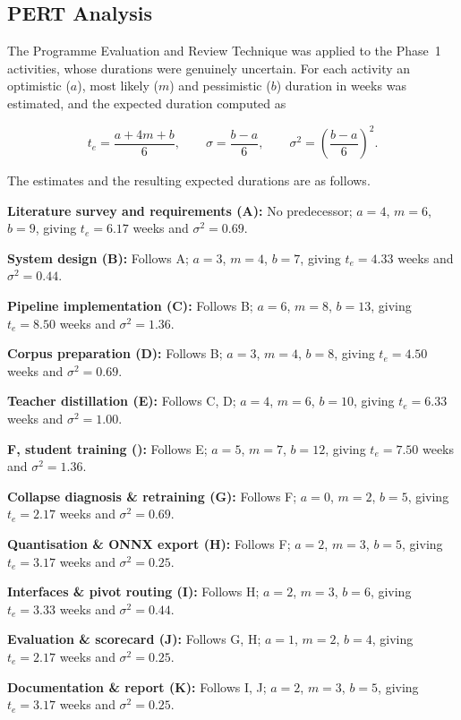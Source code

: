 \subsection{PERT Analysis}
\label{subsec:pert}

The Programme Evaluation and Review Technique was applied to the Phase~1
activities, whose durations were genuinely uncertain. For each activity an
optimistic ($a$), most likely ($m$) and pessimistic ($b$) duration in weeks was
estimated, and the expected duration computed as

\begin{equation}
t_e = \frac{a + 4m + b}{6}, \qquad
\sigma = \frac{b - a}{6}, \qquad
\sigma^2 = \left(\frac{b-a}{6}\right)^{\!2}.
\end{equation}

The estimates and the resulting expected durations are as follows.

\begin{bullets}
\item \textbf{Literature survey and requirements (A):} No predecessor; $a=4$, $m=6$, $b=9$, giving $t_e=6.17$ weeks and $\sigma^2=0.69$.
\item \textbf{System design (B):} Follows A; $a=3$, $m=4$, $b=7$, giving $t_e=4.33$ weeks and $\sigma^2=0.44$.
\item \textbf{Pipeline implementation (C):} Follows B; $a=6$, $m=8$, $b=13$, giving $t_e=8.50$ weeks and $\sigma^2=1.36$.
\item \textbf{Corpus preparation (D):} Follows B; $a=3$, $m=4$, $b=8$, giving $t_e=4.50$ weeks and $\sigma^2=0.69$.
\item \textbf{Teacher distillation (E):} Follows C, D; $a=4$, $m=6$, $b=10$, giving $t_e=6.33$ weeks and $\sigma^2=1.00$.
\item \textbf{F, student training (\seqkd{}):} Follows E; $a=5$, $m=7$, $b=12$, giving $t_e=7.50$ weeks and $\sigma^2=1.36$.
\item \textbf{Collapse diagnosis \& retraining (G):} Follows F; $a=0$, $m=2$, $b=5$, giving $t_e=2.17$ weeks and $\sigma^2=0.69$.
\item \textbf{Quantisation \& ONNX export (H):} Follows F; $a=2$, $m=3$, $b=5$, giving $t_e=3.17$ weeks and $\sigma^2=0.25$.
\item \textbf{Interfaces \& pivot routing (I):} Follows H; $a=2$, $m=3$, $b=6$, giving $t_e=3.33$ weeks and $\sigma^2=0.44$.
\item \textbf{Evaluation \& scorecard (J):} Follows G, H; $a=1$, $m=2$, $b=4$, giving $t_e=2.17$ weeks and $\sigma^2=0.25$.
\item \textbf{Documentation \& report (K):} Follows I, J; $a=2$, $m=3$, $b=5$, giving $t_e=3.17$ weeks and $\sigma^2=0.25$.
\end{bullets}


